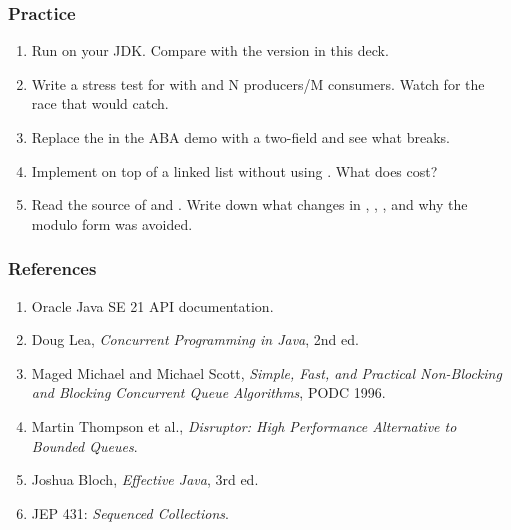\documentclass[aspectratio=169,10pt,compress]{beamer}
\begin{document}
\begin{frame}[t,fragile] \frametitle{Practice}
  \begin{enumerate}\small
    \item Run  on your JDK.
          Compare with the version in this deck.
    \item Write a stress test for  with
           and N producers/M consumers.
          Watch for the race that  would catch.
    \item Replace the  in the ABA demo
          with a two-field  and see
          what breaks.
    \item Implement  on top of a linked
          list without using . What does 
          cost?
    \item Read the source of  and .
          Write down what changes in , ,
          , and why the modulo form was avoided.
  \end{enumerate}
\end{frame}




\begin{frame}[t,fragile] \frametitle{References}
  \begin{enumerate}
    \item Oracle Java SE 21 API documentation.
    \item Doug Lea, \emph{Concurrent Programming in Java}, 2nd ed.
    \item Maged Michael and Michael Scott, \emph{Simple, Fast, and
          Practical Non-Blocking and Blocking Concurrent Queue Algorithms},
          PODC 1996.
    \item Martin Thompson et al., \emph{Disruptor: High Performance
          Alternative to Bounded Queues}.
    \item Joshua Bloch, \emph{Effective Java}, 3rd ed.
    \item JEP 431: \emph{Sequenced Collections}.
  \end{enumerate}
\end{frame}




\begin{frame}[t,fragile]
	\begin{center}
		\vspace{4cm}
	\end{center}
\end{frame}
\end{document}
